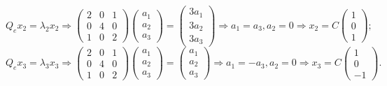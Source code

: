 \begin{enumerate}
$Q_e x_2 = \lambda_2 x_2 \Rightarrow \begin{pmatrix} 2 & 0 & 1 \\ 0 & 4 & 0\\ 1 & 0 & 2 \end{pmatrix} \begin{pmatrix} a_1 \\ a_2 \\ a_3 \end{pmatrix} = \begin{pmatrix} 3a_1 \\ 3a_2 \\ 3a_3 \end{pmatrix}  \Rightarrow a_1 = a_3, a_2 = 0 \Rightarrow x_2 = C\begin{pmatrix} 1 \\ 0 \\ 1 \end{pmatrix};$
$Q_e x_3 = \lambda_3 x_3 \Rightarrow \begin{pmatrix} 2 & 0 & 1 \\ 0 & 4 & 0\\ 1 & 0 & 2 \end{pmatrix} \begin{pmatrix} a_1 \\ a_2 \\ a_3 \end{pmatrix} = \begin{pmatrix} a_1 \\ a_2 \\ a_3 \end{pmatrix}  \Rightarrow a_1 = -a_3, a_2 = 0 \Rightarrow x_3 = C\begin{pmatrix} 1 \\ 0 \\ -1 \end{pmatrix}.$ \\

\end{enumerate}
